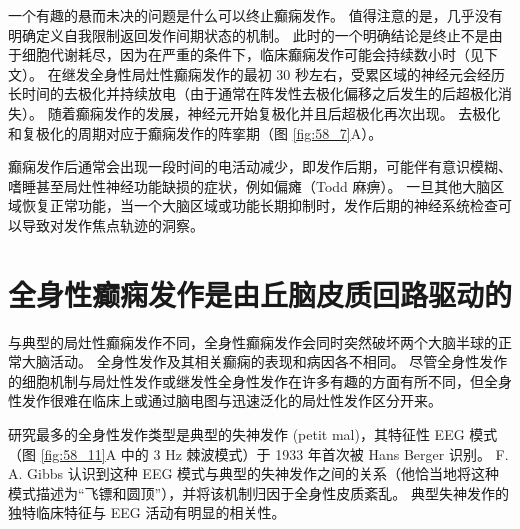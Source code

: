 一个有趣的悬而未决的问题是什么可以终止癫痫发作。 值得注意的是，几乎没有明确定义自我限制返回发作间期状态的机制。 此时的一个明确结论是终止不是由于细胞代谢耗尽，因为在严重的条件下，临床癫痫发作可能会持续数小时（见下文）。 在继发全身性局灶性癫痫发作的最初 30 秒左右，受累区域的神经元会经历长时间的去极化并持续放电（由于通常在阵发性去极化偏移之后发生的后超极化消失）。 随着癫痫发作的发展，神经元开始复极化并且后超极化再次出现。 去极化和复极化的周期对应于癫痫发作的阵挛期（图 \ref{fig:58_7}A）。

癫痫发作后通常会出现一段时间的电活动减少，即发作后期，可能伴有意识模糊、嗜睡甚至局灶性神经功能缺损的症状，例如偏瘫（Todd 麻痹）。 一旦其他大脑区域恢复正常功能，当一个大脑区域或功能长期抑制时，发作后期的神经系统检查可以导致对发作焦点轨迹的洞察。

\section{全身性癫痫发作是由丘脑皮质回路驱动的}

与典型的局灶性癫痫发作不同，全身性癫痫发作会同时突然破坏两个大脑半球的正常大脑活动。 全身性发作及其相关癫痫的表现和病因各不相同。 尽管全身性发作的细胞机制与局灶性发作或继发性全身性发作在许多有趣的方面有所不同，但全身性发作很难在临床上或通过脑电图与迅速泛化的局灶性发作区分开来。

研究最多的全身性发作类型是典型的失神发作 (petit mal)，其特征性 EEG 模式（图 \ref{fig:58_11}A 中的 3 Hz 棘波模式）于 1933 年首次被 Hans Berger 识别。 F. A. Gibbs 认识到这种 EEG 模式与典型的失神发作之间的关系（他恰当地将这种模式描述为“飞镖和圆顶”），并将该机制归因于全身性皮质紊乱。 典型失神发作的独特临床特征与 EEG 活动有明显的相关性。

